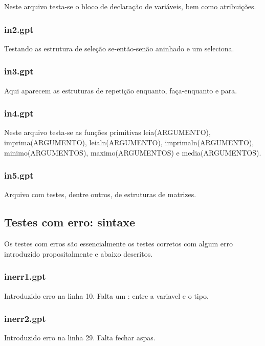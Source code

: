 \documentclass[a4paper,12pt]{report}
\begin{document}
Neste arquivo testa-se o bloco de declara\c{c}\~ao de vari\'aveis, bem como atribui\c{c}\~oes.

\subsubsection{in2.gpt}

Testando as estrutura de sele\c{c}\~ao se-ent\~ao-sen\~ao aninhado e um seleciona.

\subsubsection{in3.gpt}

Aqui aparecem as estruturas de repeti\c{c}\~ao enquanto, fa\c{c}a-enquanto e para.

\subsubsection{in4.gpt}

Neste arquivo testa-se as fun\c{c}\~oes primitivas leia(ARGUMENTO), imprima(ARGUMENTO), 
leialn(ARGUMENTO), imprimaln(ARGUMENTO), minimo(ARGUMENTOS), 
maximo(ARGUMENTOS) e 
media(ARGUMENTOS).

\subsubsection{in5.gpt}

Arquivo com testes, dentre outros, de estruturas de matrizes.

\subsection{Testes com erro: sintaxe}

Os testes com erros s\~ao essencialmente os testes corretos com algum erro 
introduzido propositalmente
e abaixo descritos.

\subsubsection{inerr1.gpt}

Introduzido erro na linha 10. Falta um : entre a variavel e o tipo.

\subsubsection{inerr2.gpt}

Introduzido erro na linha 29. Falta fechar aspas.
\end{document}

